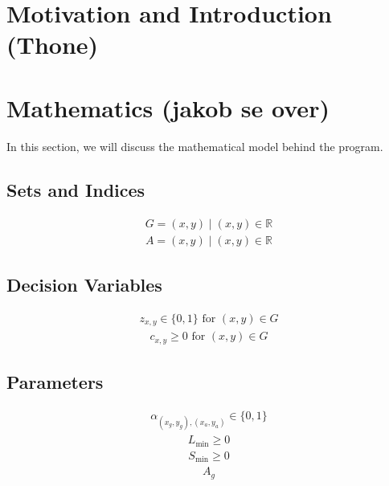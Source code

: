 \documentclass{article}
\begin{document}
\newpage

\section{Motivation and Introduction (Thone)}

\newpage

\section{Mathematics (jakob se over)}

In this section, we will discuss the mathematical model behind the program.

\subsection{Sets and Indices}

\begin{align}
    G = (x, y) \mid (x, y) \in \mathbb{R}
\end{align}
\begin{align}
    A = (x, y) \mid (x, y) \in \mathbb{R}
\end{align}

\subsection{Decision Variables}

\begin{align}
    z_{x, y} \in \{0, 1\} \text{ for } (x, y) \in G
\end{align}
\begin{align}
    c_{x, y} \geq 0 \text{ for } (x, y) \in G
\end{align}

\subsection{Parameters}

\begin{align}
    \alpha_{(x_g, y_g), (x_a, y_a)} \in \{0, 1\}
\end{align}
\begin{align}
    L_{\min} \geq 0
\end{align}
\begin{align}
        S_{\min} \geq 0
\end{align}
\begin{align}
    A_g
\end{align}
\end{document}
